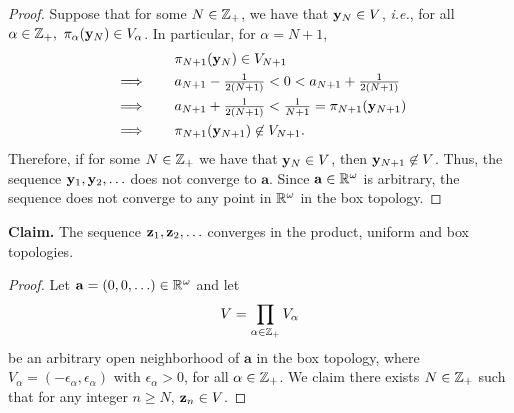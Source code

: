 \begin{solution}
\begin{proof}
        Suppose that for some $N \in \mathbb{Z}_+$, we have that $\mathbf{y}_N \in V$, \textit{i.e.}, for all $\alpha \in \mathbb{Z}_+,~ \pi_\alpha(\mathbf{y}_N) \in V_\alpha$.
        In particular, for $\alpha = N+1$,
        \begin{alignat*}{2}
            &           && \quad \pi_{N+1}(\mathbf{y}_N) \in V_{N+1} \\
            & \implies  && \quad a_{N+1} - \tfrac{1}{2(N+1)} < 0 < a_{N+1} + \tfrac{1}{2(N+1)} \\
            & \implies  && \quad a_{N+1} + \tfrac{1}{2(N+1)} < \tfrac{1}{N + 1} = \pi_{N+1}(\mathbf{y}_{N+1}) \\
            & \implies  && \quad \pi_{N+1}(\mathbf{y}_{N+1}) \not\in V_{N+1}.
        \end{alignat*}
        Therefore, if for some $N \in \mathbb{Z}_+$ we have that $\mathbf{y}_N \in V$, then $\mathbf{y}_{N+1} \not\in V$.
        Thus, the sequence $\mathbf{y}_1, \mathbf{y}_2, \ldots$ does not converge to $\mathbf{a}$.
        Since $\mathbf{a} \in \mathbb{R}^\omega$ is arbitrary, the sequence does not converge to any point in $\mathbb{R}^\omega$ in the box topology.
    \end{proof}
    \bigskip

    \noindent\textbf{Claim.} The sequence $\mathbf{z}_1, \mathbf{z}_2, \ldots$ converges in the product, uniform and box topologies.
    \begin{proof}
        Let $\mathbf{a} = (0, 0, \ldots) \in \mathbb{R}^\omega$ and let
        \begin{equation*}
            V = \prod_{\alpha\in\mathbb{Z}_+} V_\alpha
        \end{equation*}
        be an arbitrary open neighborhood of $\mathbf{a}$ in the box topology, where $V_\alpha = (-\epsilon_\alpha, \epsilon_\alpha)$ with $\epsilon_\alpha > 0$, for all $\alpha \in \mathbb{Z}_+$.
        We claim there exists $N \in \mathbb{Z}_+$ such that for any integer $n \geq N$, $\mathbf{z}_n \in V$.


\end{proof}
\end{solution}
